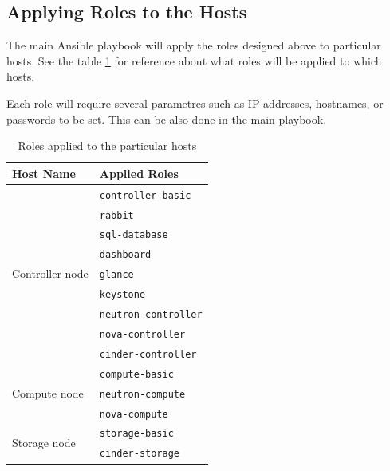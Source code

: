 \subsection{Applying Roles to the Hosts}

The main Ansible playbook will apply the roles designed above to particular hosts. See the table \ref{table-roles} for reference about what roles will be applied to which hosts.

Each role will require several parametres such as IP addresses, hostnames, or passwords to be set. This can be also done in the main playbook.

\begin{table}[!h]
  \centering
  \begin{tabular}{|l|l|}
    \hline
      Host Name       & Applied Roles                             \\
    \hline
    \multirow{9}{*}{Controller node} & \texttt{controller-basic}  \\
      & \texttt{rabbit} \\
      & \texttt{sql-database} \\
      & \texttt{dashboard} \\
      & \texttt{glance} \\
      & \texttt{keystone} \\
      & \texttt{neutron-controller} \\
      & \texttt{nova-controller} \\
      & \texttt{cinder-controller} \\
    \hline
    \multirow{3}{*}{Compute node} & \texttt{compute-basic} \\
      & \texttt{neutron-compute} \\
      & \texttt{nova-compute} \\
      \hline
    \multirow{2}{*}{Storage node} & \texttt{storage-basic} \\
      & \texttt{cinder-storage} \\
    \hline
  \end{tabular}
\caption{Roles applied to the particular hosts}
\label{table-roles}
\end{table}
